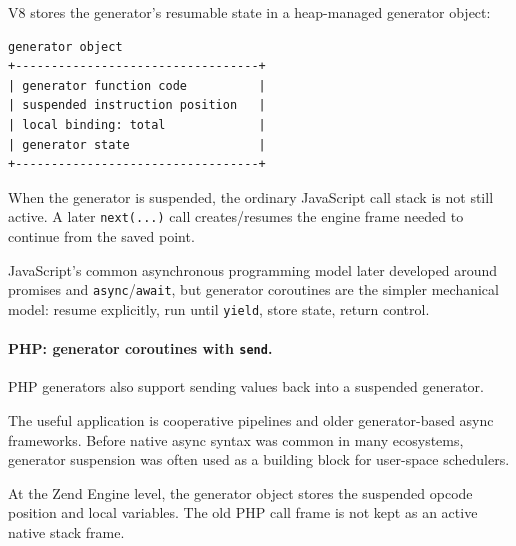 V8 stores the generator's resumable state in a heap-managed generator object:

\begin{verbatim}
generator object
+----------------------------------+
| generator function code          |
| suspended instruction position   |
| local binding: total             |
| generator state                  |
+----------------------------------+
\end{verbatim}

When the generator is suspended, the ordinary JavaScript call stack is not still active. A later \texttt{next(...)} call creates/resumes the engine frame needed to continue from the saved point.

JavaScript's common asynchronous programming model later developed around promises and \texttt{async}/\texttt{await}, but generator coroutines are the simpler mechanical model: resume explicitly, run until \texttt{yield}, store state, return control.

\paragraph{PHP: generator coroutines with \texttt{send}.}

PHP generators also support sending values back into a suspended generator.



The useful application is cooperative pipelines and older generator-based async frameworks. Before native async syntax was common in many ecosystems, generator suspension was often used as a building block for user-space schedulers.

At the Zend Engine level, the generator object stores the suspended opcode position and local variables. The old PHP call frame is not kept as an active native stack frame.

